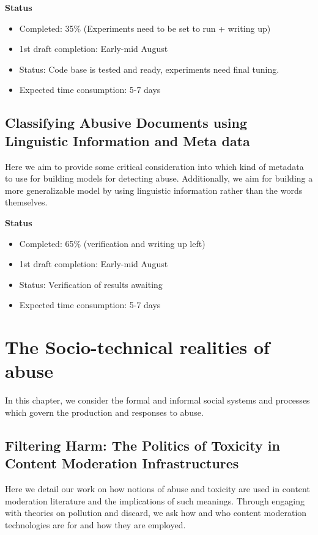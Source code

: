 {\textbf{Status}
\begin{itemize}
    \item Completed: 35\% (Experiments need to be set to run + writing up)
    \item 1st draft completion: Early-mid August
    \item Status: Code base is tested and ready, experiments need final tuning.
    \item Expected time consumption: 5-7 days
\end{itemize}

\subsection{Classifying Abusive Documents using Linguistic Information and Meta data}
Here we aim to provide some critical consideration into which kind of metadata to use for building models for detecting abuse. Additionally, we aim for building a more generalizable model by using linguistic information rather than the words themselves.

\textbf{Status}
\begin{itemize}
    \item Completed: 65\% (verification and writing up left)
    \item 1st draft completion: Early-mid August
    \item Status: Verification of results awaiting
    \item Expected time consumption: 5-7 days
\end{itemize}

\section{The Socio-technical realities of abuse}

In this chapter, we consider the formal and informal social systems and processes which govern the production and responses to abuse.

\subsection{Filtering Harm: The Politics of Toxicity in Content Moderation Infrastructures}
Here we detail our work on how notions of abuse and toxicity are used in content moderation literature and the implications of such meanings. Through engaging with theories on pollution and discard, we ask how and who content moderation technologies are for and how they are employed.

}
